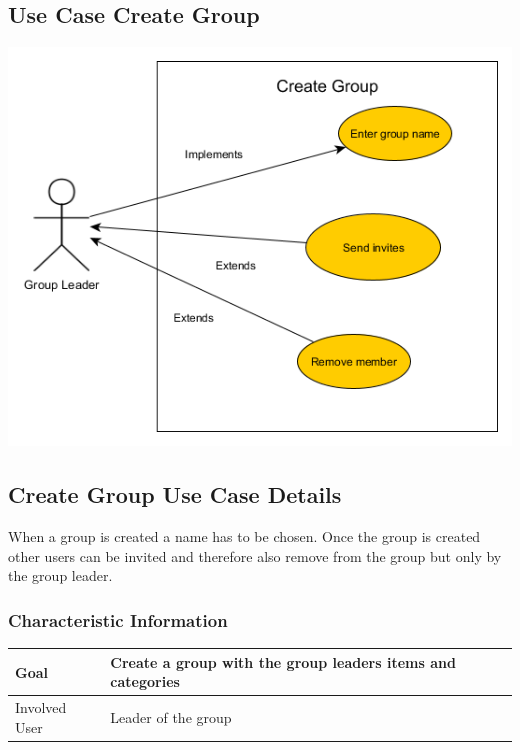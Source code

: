 \documentclass[12pt]{article}
\theoremstyle{definition}
\begin{document}
\subsection{Use Case Create Group}

\includegraphics[scale=.5]{UseCaseCreateGroup.png}\\

\subsection{Create Group Use Case Details}

When a group is created a name has to be chosen. Once the group is created other users can be invited and therefore also remove from the group but only by the group leader.

\subsubsection{Characteristic Information}

\begin{tabular}{|l|l|}
\hline
Goal &  Create a group with the group leaders items and categories\\ \hline
Involved User & Leader of the group \\ \hline
\end{tabular}
\end{document}
